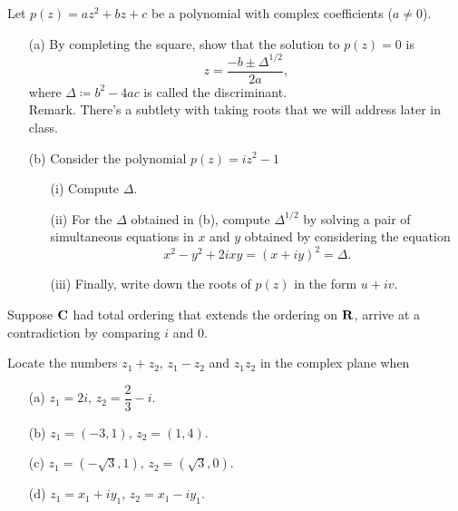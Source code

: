 \vspace*{0.1in}

\begin{problem}\label{prob 1.5a}
Let $p(z) = az^2 + bz + c$ be a polynomial with complex coefficients ($a\neq 0$). 
\begin{itemize}
\item[(a)] By completing the square, show that the solution to $p(z) = 0$ is
\[z = \frac{-b \pm \Delta^{1/2}}{2a},\]
where $\Delta \coloneqq b^2 - 4ac$ is called the discriminant.\\[0.5em]
{\footnotesize Remark. There's a subtlety with taking roots that we will address later in class.}
\item[(b)] Consider the polynomial $p(z) = iz^2 -1$
\begin{itemize}
\item[(i)] Compute $\Delta$.
\item[(ii)] For the $\Delta$ obtained in (b), compute $\Delta^{1/2}$ by solving a pair of simultaneous equations in $x$ and $y$ obtained by considering the equation \[x^2 - y^2 + 2ixy = (x + iy)^2 = \Delta.\]
\item[(iii)] Finally, write down the roots of $p(z)$ in the form $u + iv$.
\end{itemize}
\end{itemize}
\end{problem}

\vspace*{0.1in}

\begin{problem}\label{prob 1.6}
Suppose $\mathbf C$ had total ordering that extends the ordering on $\mathbf R$, arrive at a contradiction by comparing $i$ and $0$.
\end{problem}

\vspace*{0.1in}

\begin{problem}\label{prob 1.7}
Locate the numbers $z_1 + z_2,\, z_1 - z_2$ and $z_1z_2$ in the complex plane when
\begin{multicols}{2}
\begin{itemize}
\item[(a)] $z_1 = 2i,\, z_2 = \dfrac{2}{3} - i$.
\item[(b)] $z_1 = (-3,1),\,z_2 = (1,4)$.
\item[(c)] $z_1 = (-\sqrt{3},1),\,z_2 = (\sqrt{3},0)$.
\item[(d)] $z_1 = x_1 + iy_1,\,z_2 = x_1 - iy_1$.
\end{itemize}
\end{multicols}
\end{problem}

